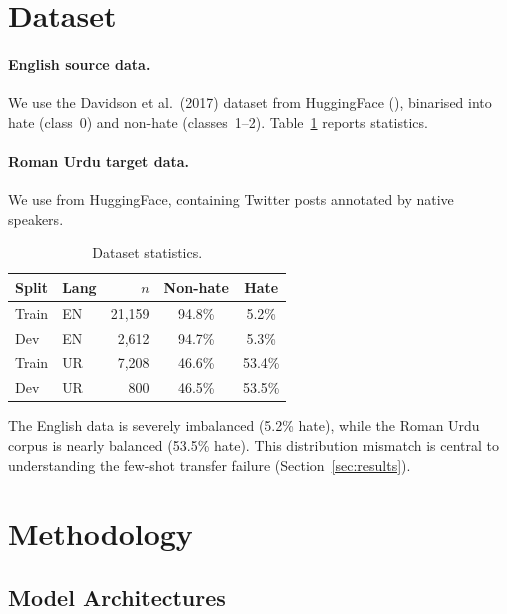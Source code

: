 \documentclass{article}
\begin{document}
\section{Dataset}
\label{sec:data}

\paragraph{English source data.}
We use the Davidson et al.\ (2017) dataset from HuggingFace
(), binarised into hate (class~0) and
non-hate (classes~1--2). Table~\ref{tab:data} reports statistics.

\paragraph{Roman Urdu target data.}
We use  from HuggingFace,
containing Twitter posts annotated by native speakers.

\begin{table}[h]
\centering
\caption{Dataset statistics.}
\label{tab:data}
\vskip 0.05in
\begin{small}
\begin{tabular}{llrcc}
\toprule
Split & Lang & $n$ & Non-hate & Hate \\
\midrule
Train & EN   & 21,159 & 94.8\% & 5.2\%  \\
Dev   & EN   &  2,612 & 94.7\% & 5.3\%  \\
Train & UR   &  7,208 & 46.6\% & 53.4\% \\
Dev   & UR   &    800 & 46.5\% & 53.5\% \\
\bottomrule
\end{tabular}
\end{small}
\end{table}

The English data is severely imbalanced (5.2\% hate), while the Roman Urdu corpus
is nearly balanced (53.5\% hate). This distribution mismatch is central to
understanding the few-shot transfer failure (Section~\ref{sec:results}).

\section{Methodology}
\label{sec:method}

\subsection{Model Architectures}
\end{document}
